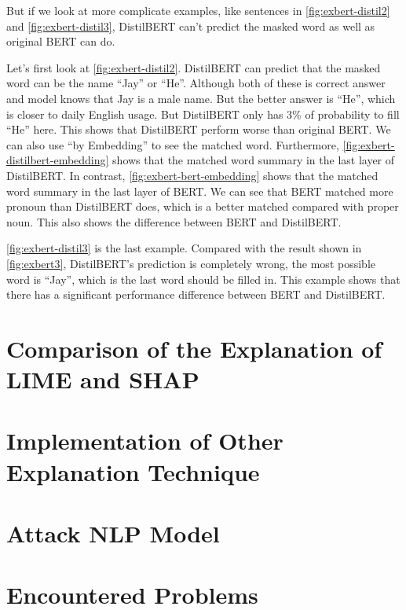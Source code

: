 \documentclass{article}[12pt]
\begin{document}
But if we look at more complicate examples, like sentences in \autoref{fig:exbert-distil2} and \autoref{fig:exbert-distil3}, DistilBERT can't predict the masked word as well as original BERT can do.

Let's first look at \autoref{fig:exbert-distil2}. DistilBERT can predict that the masked word can be the name ``Jay'' or ``He''. Although both of these is correct answer and model knows that Jay is a male name. But the better answer is ``He'', which is closer to daily English usage. But DistilBERT only has 3\% of probability to fill ``He'' here. This shows that DistilBERT perform worse than original BERT. We can also use ``by Embedding'' to see the matched word. Furthermore, \autoref{fig:exbert-distilbert-embedding} shows that the matched word summary in the last layer of DistilBERT. In contrast, \autoref{fig:exbert-bert-embedding} shows that the matched word summary in the last layer of BERT. We can see that BERT matched more pronoun than DistilBERT does, which is a better matched compared with proper noun. This also shows the difference between BERT and DistilBERT.

\autoref{fig:exbert-distil3} is the last example. Compared with the result shown in \autoref{fig:exbert3}, DistilBERT's prediction is completely wrong, the most possible word is ``Jay'', which is the last word should be filled in. This example shows that there has a significant performance difference between BERT and DistilBERT.

\section{Comparison of the Explanation of LIME and SHAP}

\section{Implementation of Other Explanation Technique}

\section{Attack NLP Model}

\section{Encountered Problems}
\end{document}
